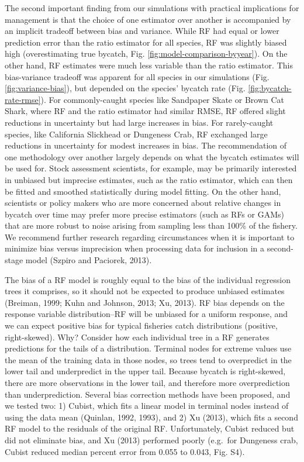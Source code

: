 \documentclass[]{article}
\begin{document}
The second important finding from our simulations with practical
implications for management is that the choice of one estimator over
another is accompanied by an implicit tradeoff between bias and
variance. While RF had equal or lower prediction error than the ratio
estimator for all species, RF was slightly biased high (overestimating
true bycatch, Fig. \ref{fig:model-comparison-byyear}). On the other
hand, RF estimates were much less variable than the ratio estimator.
This bias-variance tradeoff was apparent for all species in our
simulations (Fig. \ref{fig:variance-bias}), but depended on the species'
bycatch rate (Fig. \ref{fig:bycatch-rate-rmse}). For commonly-caught
species like Sandpaper Skate or Brown Cat Shark, where RF and the ratio
estimator had similar RMSE, RF offered slight reductions in uncertainty
but had large increases in bias. For rarely-caught species, like
California Slickhead or Dungeness Crab, RF exchanged large reductions in
uncertainty for modest increases in bias. The recommendation of one
methodology over another largely depends on what the bycatch estimates
will be used for. Stock assessment scientists, for example, may be
primarily interested in unbiased but imprecise estimates, such as the
ratio estimator, which can then be fitted and smoothed statistically
during model fitting. On the other hand, scientists or policy makers who
are more concerned about relative changes in bycatch over time may
prefer more precise estimators (such as RFs or GAMs) that are more
robust to noise arising from sampling less than 100\% of the fishery. We
recommend further research regarding circumstances when it is important
to minimize bias versus imprecision when processing data for inclusion
in a second-stage model (Szpiro and Paciorek, 2013).

The bias of a RF model is roughly equal to the bias of the individual
regression trees it comprises, so it should not be expected to produce
unbiased estimates (Breiman, 1999; Kuhn and Johnson, 2013; Xu, 2013). RF
bias depends on the response variable distribution--RF will be unbiased
for a uniform response, and we can expect positive bias for typical
fisheries catch distributions (positive, right-skewed). Why? Consider
how each individual tree in a RF generates predictions for the tails of
a distribution. Terminal nodes for extreme values use the mean of the
training data in those nodes, so trees tend to overpredict in the lower
tail and underpredict in the upper tail. Because bycatch is
right-skewed, there are more observations in the lower tail, and
therefore more overprediction than underprediction. Several bias
correction methods have been proposed, and we tested two: 1) Cubist,
which fits a linear model in terminal nodes instead of using the data
mean (Quinlan, 1992, 1993), and 2) Xu (2013), which fits a second RF
model to the residuals of the original RF. Unfortunately, Cubist reduced
but did not eliminate bias, and Xu (2013) performed poorly (e.g.~for
Dungeness crab, Cubist reduced median percent error from 0.055 to 0.043,
Fig. S4).
\end{document}
